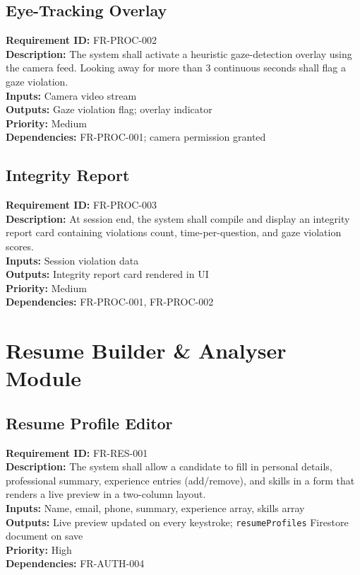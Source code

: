 \documentclass{fisatinternship}
\begin{document}
\vspace{0.4cm}

\subsection{Eye-Tracking Overlay}
\textbf{Requirement ID:} FR-PROC-002\\
\textbf{Description:} The system shall activate a heuristic gaze-detection overlay using
the camera feed. Looking away for more than 3 continuous seconds shall flag a gaze violation.\\
\textbf{Inputs:} Camera video stream\\
\textbf{Outputs:} Gaze violation flag; overlay indicator\\
\textbf{Priority:} Medium\\
\textbf{Dependencies:} FR-PROC-001; camera permission granted

\vspace{0.4cm}

\subsection{Integrity Report}
\textbf{Requirement ID:} FR-PROC-003\\
\textbf{Description:} At session end, the system shall compile and display an integrity
report card containing violations count, time-per-question, and gaze violation scores.\\
\textbf{Inputs:} Session violation data\\
\textbf{Outputs:} Integrity report card rendered in UI\\
\textbf{Priority:} Medium\\
\textbf{Dependencies:} FR-PROC-001, FR-PROC-002

\vspace{0.4cm}

\section{Resume Builder \& Analyser Module}

\subsection{Resume Profile Editor}
\textbf{Requirement ID:} FR-RES-001\\
\textbf{Description:} The system shall allow a candidate to fill in personal details,
professional summary, experience entries (add/remove), and skills in a form that renders
a live preview in a two-column layout.\\
\textbf{Inputs:} Name, email, phone, summary, experience array, skills array\\
\textbf{Outputs:} Live preview updated on every keystroke; \texttt{resumeProfiles}
Firestore document on save\\
\textbf{Priority:} High\\
\textbf{Dependencies:} FR-AUTH-004
\end{document}
